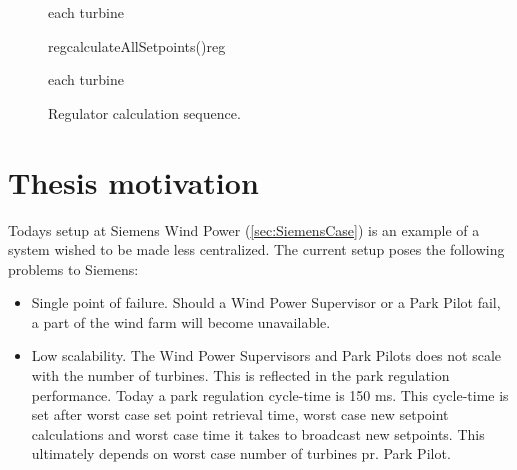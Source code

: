 
\begin{figure}
	\centering
	\begin{sequencediagram} %
	
		\begin{sdblock}{each turbine}{}
		\end{sdblock}
		
		\begin{call}{reg}{calculateAllSetpoints()}{reg}{}
		\end{call}
	
		\begin{sdblock}{each turbine}{}
		\end{sdblock}
					
	\end{sequencediagram}

	\caption[Regulator calculation sequence]{
		\label{fig:dataComputationSequence} 
		\footnotesize{%
			Regulator calculation sequence.
		}
	}
\end{figure}

\section{Thesis motivation}
Todays setup at Siemens Wind Power (\cref{sec:SiemensCase}) is an example of a system wished to be made less centralized. The current setup poses the following problems to Siemens:  

\begin{itemize} 
	\item Single point of failure. Should a Wind Power Supervisor or a Park Pilot fail, a part of the wind farm will become unavailable.
	\item Low scalability. The Wind Power Supervisors and Park Pilots does not scale with the number of turbines. This is reflected in the park regulation performance. Today a park regulation cycle-time is 150 ms. This cycle-time is set after worst case set point retrieval time, worst case new setpoint calculations and worst case time it takes to broadcast new setpoints. This ultimately depends on worst case number of turbines pr. Park Pilot.
\end{itemize}

